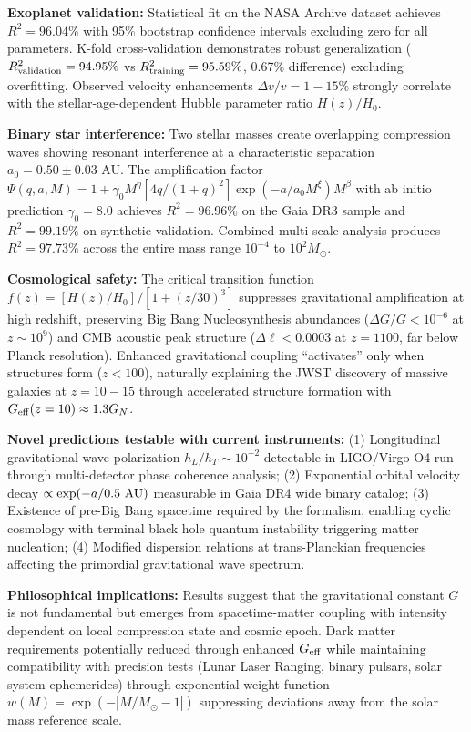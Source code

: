 \documentclass[11pt,a4paper]{article}
\begin{document}
\textbf{Exoplanet validation:} Statistical fit on the NASA Archive
dataset achieves \(R^2 = 96.04\%\) with 95\% bootstrap confidence
intervals excluding zero for all parameters. K-fold cross-validation
demonstrates robust generalization (\(R^2_{\rm validation} = 94.95\%\)
vs \(R^2_{\rm training} = 95.59\%\), 0.67\% difference) excluding
overfitting. Observed velocity enhancements \(\Delta v/v = 1-15\%\)
strongly correlate with the stellar-age-dependent Hubble parameter ratio
\(H(z)/H_0\).

\textbf{Binary star interference:} Two stellar masses create overlapping
compression waves showing resonant interference at a characteristic
separation \(a_0 = 0.50 \pm 0.03\) AU. The amplification factor
\(\Psi(q,a,M) = 1 + \gamma_0 M^\eta [4q/(1+q)^2] \exp(-a/a_0 M^\xi) M^\beta\)
with ab initio prediction \(\gamma_0 = 8.0\) achieves \(R^2 = 96.96\%\)
on the Gaia DR3 sample and \(R^2 = 99.19\%\) on synthetic validation.
Combined multi-scale analysis produces \(R^2 = 97.73\%\) across the
entire mass range \(10^{-4}\) to \(10^2 M_\odot\).

\textbf{Cosmological safety:} The critical transition function
\(f(z) = [H(z)/H_0]/[1+(z/30)^3]\) suppresses gravitational
amplification at high redshift, preserving Big Bang Nucleosynthesis
abundances (\(\Delta G/G < 10^{-6}\) at \(z \sim 10^9\)) and CMB
acoustic peak structure (\(\Delta\ell < 0.0003\) at \(z=1100\), far
below Planck resolution). Enhanced gravitational coupling ``activates''
only when structures form (\(z < 100\)), naturally explaining the JWST
discovery of massive galaxies at \(z = 10-15\) through accelerated
structure formation with \(G_{\rm eff}(z=10) \approx 1.3 G_N\).

\textbf{Novel predictions testable with current instruments:} (1)
Longitudinal gravitational wave polarization \(h_L/h_T \sim 10^{-2}\)
detectable in LIGO/Virgo O4 run through multi-detector phase coherence
analysis; (2) Exponential orbital velocity decay
\(\propto \exp(-a/0.5~{\rm AU})\) measurable in Gaia DR4 wide binary
catalog; (3) Existence of pre-Big Bang spacetime required by the
formalism, enabling cyclic cosmology with terminal black hole quantum
instability triggering matter nucleation; (4) Modified dispersion
relations at trans-Planckian frequencies affecting the primordial
gravitational wave spectrum.

\textbf{Philosophical implications:} Results suggest that the
gravitational constant \(G\) is not fundamental but emerges from
spacetime-matter coupling with intensity dependent on local compression
state and cosmic epoch. Dark matter requirements potentially reduced
through enhanced \(G_{\rm eff}\) while maintaining compatibility with
precision tests (Lunar Laser Ranging, binary pulsars, solar system
ephemerides) through exponential weight function
\(w(M) = \exp(-|M/M_\odot - 1|)\) suppressing deviations away from the
solar mass reference scale.
\end{document}

